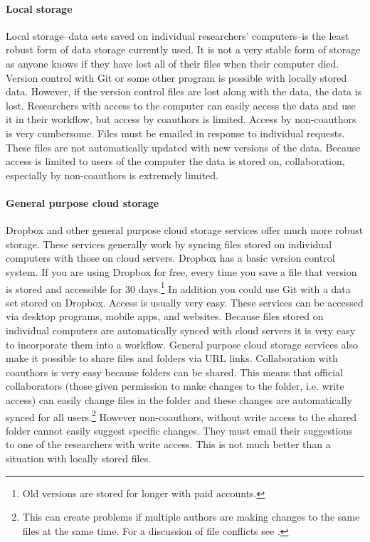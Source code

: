 \documentclass[twocolumn]{article}\usepackage{graphicx, color}
\begin{document}
\paragraph{Local storage}

Local storage--data sets saved on individual researchers' computers--is the least robust form of data storage currently used. It is not a very stable form of storage as anyone knows if they have lost all of their files when their computer died. Version control with Git or some other program is possible with locally stored data. However, if the version control files are lost along with the data, the data is lost. Researchers with access to the computer can easily access the data and use it in their workflow, but access by coauthors is limited. Access by non-coauthors is very cumbersome. Files must be emailed in response to individual requests. These files are not automatically updated with new versions of the data. Because access is limited to users of the computer the data is stored on, collaboration, especially by non-coauthors is extremely limited.

\paragraph{General purpose cloud storage}

Dropbox and other general purpose cloud storage services offer much more robust storage. These services generally work by syncing files stored on individual computers with those on cloud servers. Dropbox has a basic version control system. If you are using Dropbox for free, every time you save a file that version is stored and accessible for 30 days.\footnote{Old versions are stored for longer with paid accounts.} In addition you could use Git with a data set stored on Dropbox. Access is usually very easy. These services can be accessed via desktop programs, mobile apps, and websites. Because files stored on individual computers are automatically synced with cloud servers it is very easy to incorporate them into a workflow. General purpose cloud storage services also make it possible to share files and folders via URL links. Collaboration with coauthors is very easy because folders can be shared. This means that official collaborators (those given permission to make changes to the folder, i.e. write access) can easily change files in the folder and these changes are automatically synced for all users.\footnote{This can create problems if multiple authors are making changes to the same files at the same time. For a discussion of file conflicts see \cite{Fredrickson2011}.} However non-coauthors, without write access to the shared folder cannot easily suggest specific changes. They must email their suggestions to one of the researchers with write access. This is not much better than a situation with locally stored files.
\end{document}

